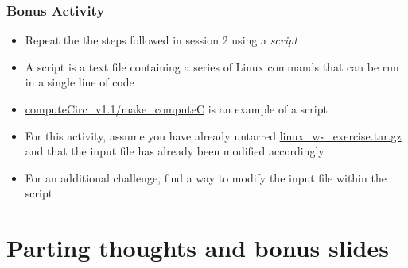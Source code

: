 \documentclass[hyperref,pdfa,unicode,utf8,usepdftitle]{beamer}
\begin{document}
\begin{frame}
  \frametitle{Bonus Activity}
  \begin{itemize}
  \item Repeat the the steps followed in session 2 using a
    \emph{script}
  \item A script is a text file containing a series of Linux commands
    that can be run in a single line of code
  \item \url{computeCirc_v1.1/make_computeC} is an example of a script
  \item For this activity, assume you have already
    untarred \url{linux_ws_exercise.tar.gz} and that the input file
    has already been modified accordingly
  \item For an additional challenge, find a way to modify the input
    file within the script
  \end{itemize}
\end{frame}

\appendix
\section{Parting thoughts and bonus slides}
\end{document}
